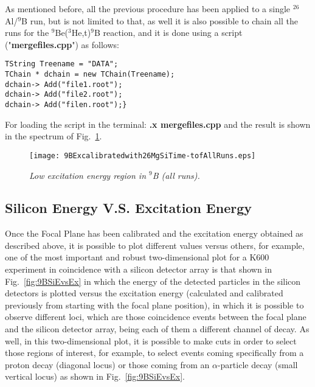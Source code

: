 \documentclass[11pt]{report}
\begin{document}
\noindent
As mentioned before, all the previous procedure has been applied to a single $^{26}$Al/$^{9}$B run, 
but is not limited to that, as well it is also possible to chain all the runs for the 
$^{9}$Be($^{3}$He,t)$^{9}$B reaction, and it is done using a script ("\textbf{mergefiles.cpp}") as follows:
\begin{verbatim}
TString Treename = "DATA";
TChain * dchain = new TChain(Treename);
dchain-> Add("file1.root");
dchain-> Add("file2.root");
dchain-> Add("filen.root");}
\end{verbatim}

\noindent
For loading the script in the terminal: \textbf{.x mergefiles.cpp} and the result is shown 
in the spectrum of Fig.~\ref{fig:9BExcalibratedwith26MgSiTime-tofAllRuns}.

\begin{figure}[h]
 \begin{center}
\texttt{[image: 9BExcalibratedwith26MgSiTime-tofAllRuns.eps]}  
 \end{center}
\vspace*{-4mm}
\caption{\label{fig:9BExcalibratedwith26MgSiTime-tofAllRuns} \it Low excitation energy region in $^{9}$B (all runs).}
\end{figure}
\vspace*{4mm}


\subsection{Silicon Energy V.S. Excitation Energy}

Once the Focal Plane has been calibrated and the excitation energy obtained as described above, 
it is possible to plot different values versus others, for example, one of the 
most important and robust two-dimensional plot for a K600 experiment in coincidence with 
a silicon detector array is that shown in Fig.~\ref{fig:9BSiEvsEx} in which the energy of the detected
particles in the silicon detectors is plotted versus the excitation energy (calculated and
calibrated previously from starting with the focal plane position), in which it is 
possible to observe different loci, which are those coincidence events between the focal plane 
and the silicon detector array, being each of them a different channel of decay.
As well, in this two-dimensional plot, it is possible to make cuts in order to select those 
regions of interest, for example, to select events coming specifically from a 
proton decay (diagonal locus) or those coming from an $\alpha$-particle decay 
(small vertical locus) as shown in Fig.~\ref{fig:9BSiEvsEx}.
\end{document}
